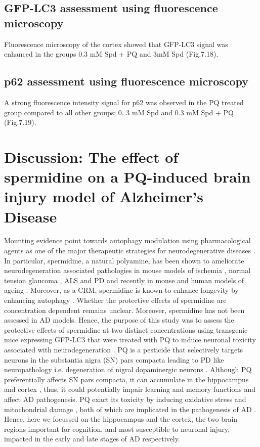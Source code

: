 
\subsection{GFP-LC3 assessment using fluorescence microscopy}
Fluorescence microscopy of the cortex showed that GFP-LC3 signal was enhanced in the groups 0.3 mM Spd + PQ and 3mM Spd (Fig.7.18).


\subsection{p62 assessment using fluorescence microscopy}
A strong fluorescence intensity signal for p62 was observed in the PQ treated group compared to all other groups; 0. 3 mM Spd and 0.3 mM Spd + PQ (Fig.7.19).


\section{Discussion: The effect of spermidine on a PQ-induced brain injury model of Alzheimer's Disease}
Mounting evidence point towards autophagy modulation using pharmacological agents as one of the major therapeutic strategies for neurodegenerative diseases \citep{Hebron2013,Jiang2014a,Perera2018,Ravikumar2004,Rose2010}. In particular, spermidine, a natural polyamine, has been shown to ameliorate neurodegeneration associated pathologies in mouse models of ischemia \citep{Morrison2002}, normal tension glaucoma \citep{Noro2015}, ALS \citep{Wang2012} and  PD \citep{Buttner2014} and recently in mouse and human models of ageing \citep{Schwarz2018,Wirth2019,Wirth2018}. Moreover, as a CRM, spermidine is known to enhance longevity by enhancing autophagy \citep{Marino2014}. Whether the protective effects of spermidine are concentration dependent remains unclear. Moreover, spermidine has not been assessed in AD models. Hence, the purpose of this study was to assess the protective effects of spermidine at two distinct concentrations using transgenic mice expressing GFP-LC3 \citep{Mizushima2004a} that were treated with PQ to induce neuronal toxicity associated with neurodegeneration \citep{Chen2012}. PQ is a pesticide that selectively targets neurons in the substantia nigra (SN) pars compacta leading to PD like neuropathology i.e. degeneration of nigral dopaminergic neurons \citep{McCormack2005, McCormack2002}. Although PQ preferentially affects SN pars compacta, it can accumulate in the hippocampus and cortex \citep{Landrigan2005}, thus, it could potentially impair learning and memory functions and affect AD pathogenesis. PQ exact its toxicity by inducing oxidative stress and mitochondrial damage \citep{Baltazar2014,Drechsel2008, Lin2006}, both of which are implicated in the pathogenesis of AD \citep{Lin2006}. Hence, here we focussed on the hippocampus and the cortex, the two brain regions important for cognition, and most susceptible to neuronal injury, impacted in the early and late stages of AD respectively.

